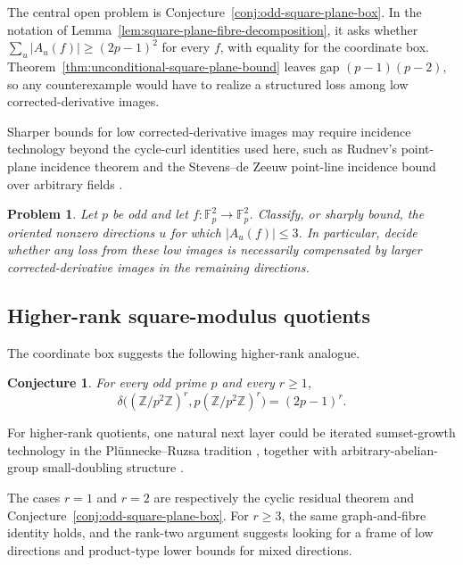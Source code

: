 \documentclass[reqno]{amsart}
\numberwithin{equation}{section}
\newtheorem{conjecture}[theorem]{Conjecture}
\newtheorem{problem}[theorem]{Problem}
\theoremstyle{definition}
\begin{document}
The central open problem is Conjecture~\ref{conj:odd-square-plane-box}.  In the
notation of Lemma~\ref{lem:square-plane-fibre-decomposition}, it asks whether
\(\sum_u |A_u(f)|\geq (2p-1)^2\) for every \(f\), with equality for the
coordinate box.  Theorem~\ref{thm:unconditional-square-plane-bound} leaves gap
\((p-1)(p-2)\), so any counterexample would have to realize a structured loss
among low corrected-derivative images.

Sharper bounds for low corrected-derivative images may require incidence
technology beyond the cycle-curl identities used here, such as Rudnev's \cite{Rudnev2018}
point-plane incidence theorem and the Stevens--de Zeeuw point-line
incidence bound over arbitrary fields
\cite{StevensDeZeeuw2017}.

\begin{problem}
\label{prob:low-direction-rigidity}
Let $p$ be odd and let $f:\mathbb F_p^2\to\mathbb F_p^2$.  Classify, or sharply
bound, the oriented nonzero directions \(u\) for which \(|A_u(f)|\leq 3\).  In
particular, decide whether any loss from these low images is necessarily
compensated by larger corrected-derivative images in the remaining directions.
\end{problem}

\subsection{Higher-rank square-modulus quotients}

The coordinate box suggests the following higher-rank analogue.

\begin{conjecture}
\label{conj:higher-rank-box}
For every odd prime $p$ and every $r\geq 1$,
\[
  \delta\bigl((\mathbb Z/p^2\mathbb Z)^r,
  p(\mathbb Z/p^2\mathbb Z)^r\bigr)=(2p-1)^r.
\]
\end{conjecture}

For higher-rank quotients, one natural next layer could be iterated
sumset-growth technology in the Plünnecke--Ruzsa tradition
\cites{Plunnecke1970,Ruzsa1989}, together with arbitrary-abelian-group
small-doubling structure \cite{GreenRuzsa2007}.

The cases \(r=1\) and \(r=2\) are respectively the cyclic residual theorem and
Conjecture~\ref{conj:odd-square-plane-box}.  For \(r\geq 3\), the same
graph-and-fibre identity holds, and the rank-two argument suggests looking for a
frame of low directions and product-type lower bounds for mixed directions.
\end{document}
